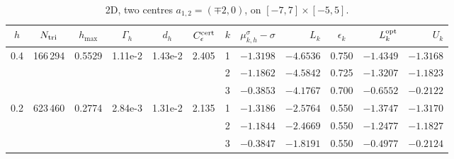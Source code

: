 \begin{table}[htbp]
\caption{2D, two centres $a_{1,2}=(\mp2,0)$, on $[-7,7]\times[-5,5]$.}
\label{tab:twocenter-2d-cecr}
\centering\footnotesize
\setlength{\tabcolsep}{2.5pt}
\begin{tabular}{cccccc|crrcrr}
\toprule
$h$ & $N_{\rm tri}$ & $h_{\max}$ & $\Gamma_h$ & $d_h$ & $C_\epsilon^{\rm cert}$ & $k$ & $\mu_{k,h}^\sigma{-}\sigma$ & $L_k$ & $\epsilon_k$ & $L_k^{\rm opt}$ & $U_k$ \\
\midrule
\multirow{3}{*}{0.4} & \multirow{3}{*}{166\,294} & \multirow{3}{*}{0.5529} & \multirow{3}{*}{1.11e-2} & \multirow{3}{*}{1.43e-2} & \multirow{3}{*}{2.405} & 1 & $-1.3198$ & $-4.6536$ & 0.750 & $-1.4349$ & $-1.3168$ \\
 & & & & & & 2 & $-1.1862$ & $-4.5842$ & 0.725 & $-1.3207$ & $-1.1823$ \\
 & & & & & & 3 & $-0.3853$ & $-4.1767$ & 0.700 & $-0.6552$ & $-0.2122$ \\
\midrule
\multirow{3}{*}{0.2} & \multirow{3}{*}{623\,460} & \multirow{3}{*}{0.2774} & \multirow{3}{*}{2.84e-3} & \multirow{3}{*}{1.31e-2} & \multirow{3}{*}{2.135} & 1 & $-1.3186$ & $-2.5764$ & 0.550 & $-1.3747$ & $-1.3170$ \\
 & & & & & & 2 & $-1.1844$ & $-2.4669$ & 0.550 & $-1.2477$ & $-1.1827$ \\
 & & & & & & 3 & $-0.3847$ & $-1.8191$ & 0.550 & $-0.4977$ & $-0.2124$ \\
\bottomrule
\end{tabular}
\end{table}

